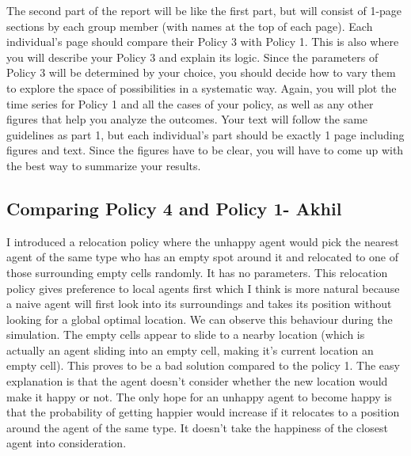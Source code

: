 \documentclass[a4paper,12pt]{article}
\begin{document}
  The second part of the report will be like the first part, but will consist of 1-page sections by each
  group member (with names at the top of each page). Each individual’s page should compare their
  Policy 3 with Policy 1. This is also where you will describe your Policy 3 and explain its logic.
  Since the parameters of Policy 3 will be determined by your choice, you should decide how to
  vary them to explore the space of possibilities in a systematic way. Again, you will plot the time series for Policy 1 and all the cases of your policy, as well as any other figures that help you
  analyze the outcomes. Your text will follow the same guidelines as part 1, but each individual’s
  part should be exactly 1 page including figures and text. Since the figures have to be clear, you
  will have to come up with the best way to summarize your results.

  \newpage
  \subsection{Comparing Policy 4 and Policy 1- Akhil}
  I introduced a relocation policy where the unhappy agent would pick the nearest agent of the same type who has an empty spot around it and relocated to one of those surrounding empty cells randomly. It has no parameters. This relocation policy gives preference to local agents first which I think is more natural because a naive agent will first look into its surroundings and takes its position without looking for a global optimal location. We can observe this behaviour during the simulation. The empty cells appear to slide to a nearby location (which is actually an agent sliding into an empty cell, making it's current location an empty cell). This proves to be a bad solution compared to the policy 1. The easy explanation is that the agent doesn't consider whether the new location would make it happy or not. The only hope for an unhappy agent to become happy is that the probability of getting happier would increase if it relocates to a position around the agent of the same type. It doesn't take the happiness of the closest agent into consideration.
\end{document}
